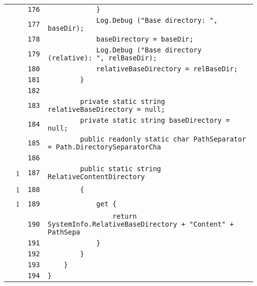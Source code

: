 \documentclass[a4paper,10pt]{article}
\begin{document}
\begin{longtable}[l]{lrrl}
\cellcolor{gray} &  & \verb~176~ & \verb~            }~\\
\cellcolor{gray} &  & \verb~177~ & \verb~            Log.Debug ("Base directory: ", baseDir);~\\
\cellcolor{gray} &  & \verb~178~ & \verb~            baseDirectory = baseDir;~\\
\cellcolor{gray} &  & \verb~179~ & \verb~            Log.Debug ("Base directory (relative): ", relBaseDir);~\\
\cellcolor{gray} &  & \verb~180~ & \verb~            relativeBaseDirectory = relBaseDir;~\\
\cellcolor{gray} &  & \verb~181~ & \verb~        }~\\
\cellcolor{gray} &  & \verb~182~ & \verb~~\\
\cellcolor{gray} &  & \verb~183~ & \verb~        private static string relativeBaseDirectory = null;~\\
\cellcolor{gray} &  & \verb~184~ & \verb~        private static string baseDirectory = null;~\\
\cellcolor{gray} &  & \verb~185~ & \verb~        public readonly static char PathSeparator = Path.DirectorySeparatorCha~\\
\cellcolor{gray} &  & \verb~186~ & \verb~~\\
\cellcolor{green} & 1 & \verb~187~ & \verb~        public static string RelativeContentDirectory~\\
\cellcolor{green} & 1 & \verb~188~ & \verb~        {~\\
\cellcolor{green} & 1 & \verb~189~ & \verb~            get {~\\
\cellcolor{gray} &  & \verb~190~ & \verb~                return SystemInfo.RelativeBaseDirectory + "Content" + PathSepa~\\
\cellcolor{gray} &  & \verb~191~ & \verb~            }~\\
\cellcolor{gray} &  & \verb~192~ & \verb~        }~\\
\cellcolor{gray} &  & \verb~193~ & \verb~    }~\\
\cellcolor{gray} &  & \verb~194~ & \verb~}~\\
\end{longtable}
\end{document}
